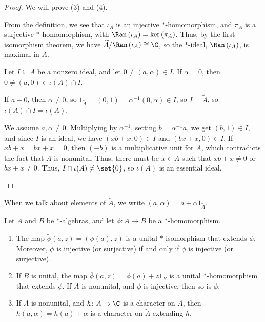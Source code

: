 \documentclass[10pt]{mypackage}
\begin{document}
\begin{proof}
  We will prove (3) and (4).
  \begin{description}[font=\normalfont]
    \item[(3)] From the definition, we see that $\iota_A$ is an injective $\ast$-homomorphism, and $\pi_A$ is a surjective $\ast$-homomorphism, with $\Ran\left(\iota_A\right) = \ker\left(\pi_A\right)$. Thus, by the first isomorphism theorem, we have $\widetilde{A}/\Ran\left(\iota_A\right) \cong \C$, so the $\ast$-ideal, $\Ran\left(\iota_A\right)$, is maximal in $A$.
    \item[(4)] Let $I\subseteq \widetilde{A}$ be a nonzero ideal, and let $0\neq \left(a,\alpha\right)\in I$. If $\alpha = 0$, then $0\neq \left(a,0\right) \in \iota(A)\cap I$.\newline

      If $a - 0$, then $\alpha \neq 0$, so $1_{\widetilde{A}} = (0,1) = \alpha^{-1}\left(0,\alpha\right)\in I$, so $I = \widetilde{A}$, so $\iota(A)\cap I = \iota(A)$.\newline
      
      We assume $a,\alpha \neq 0$. Multiplying by $\alpha^{-1}$, setting $b = \alpha^{-1}a$, we get $\left(b,1\right) \in I$, and since $I$ is an ideal, we have $\left(xb+x,0\right)\in I$ and $\left(bx+x,0\right)\in I$. If $xb + x = bx + x = 0$, then $\left(-b\right)$ is a multiplicative unit for $A$, which contradicts the fact that $A$ is nonunital. Thus, there must be $x\in A$ such that $xb + x\neq 0$ or $bx + x \neq 0$. Thus, $I\cap \iota(A)\neq \set{0}$, so $\iota(A)$ is an essential ideal.
  \end{description}
\end{proof}
When we talk about elements of $\widetilde{A}$, we write $\left(a,\alpha\right) = a + \alpha 1_{\widetilde{A}}$.
\begin{proposition}
  Let $A$ and $B$ be $\ast$-algebras, and let $\phi\colon A\rightarrow B$ be a $\ast$-homomorphism.
  \begin{enumerate}[(1)]
    \item The map $\widetilde{\phi}\left(a,z\right) = \left(\phi(a),z\right)$ is a unital $\ast$-isomorphism that extends $\phi$. Moreover, $\widetilde{\phi}$ is injective (or surjective) if and only if $\phi$ is injective (or surjective).
    \item If $B$ is unital, the map $\overline{\phi}\left(a,z\right) = \phi(a) + z1_{B}$ is a unital $\ast$-homomorphism that extends $\phi$. If $A$ is nonunital, and $\phi$ is injective, then so is $\overline{\phi}$.
    \item If $A$ is nonunital, and $h\colon A\rightarrow \C$ is a character on $A$, then $\overline{h}\left(a,\alpha\right) = h(a) + \alpha$ is a character on $\widetilde{A}$ extending $h$.
  \end{enumerate}
\end{proposition}
\end{document}
